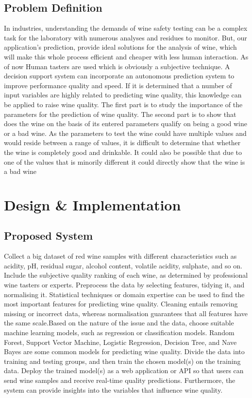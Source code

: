 \documentclass[a4paper, 12pt]{report}
\begin{document}
\section{Problem Definition}
\par In industries, understanding the demands of wine safety testing can be a complex task for the laboratory with numerous analyses and residues to monitor. But, our application's prediction, provide ideal solutions for the analysis of wine, which will make this whole process efficient and cheaper with less human interaction. As of now Human tasters are used which is obviously a subjective technique.
A decision support system can incorporate an autonomous prediction system to improve performance quality and speed. If it is determined that a number of input variables are highly related to predicting wine quality, this knowledge can be applied to raise wine quality.
The first part is to study the importance of the parameters for the prediction of wine quality. 
The second part  is to show that does the wine on the basis of its entered parameters qualify on being a good wine or a bad wine. As the parameters to test the wine could have multiple values and would reside between a range of values, it is difficult to determine that whether the wine is completely good and drinkable. It could also be possible that due to one of the values that is minorily different it could directly show that the wine is a bad wine



\chapter{Design & Implementation}
\section{Proposed System }
\par Collect a big dataset of red wine samples with different characteristics such as acidity, pH, residual sugar, alcohol content, volatile acidity, sulphate, and so on. Include the subjective quality ranking of each wine, as determined by professional wine tasters or experts.
Preprocess the data by selecting features, tidying it, and normalising it. Statistical techniques or domain expertise can be used to find the most important features for predicting wine quality. Cleaning entails removing missing or incorrect data, whereas normalisation guarantees that all features have the same scale.Based on the nature of the issue and the data, choose suitable machine learning models, such as regression or classification models. Random Forest, Support Vector Machine, Logistic Regression, Decision Tree, and Nave Bayes are some common models for predicting wine quality. Divide the data into training and testing groups, and then train the chosen model(s) on the training data. Deploy the trained model(s) as a web application or API so that users can send wine samples and receive real-time quality predictions. Furthermore, the system can provide insights into the variables that influence wine quality.
\end{document}
